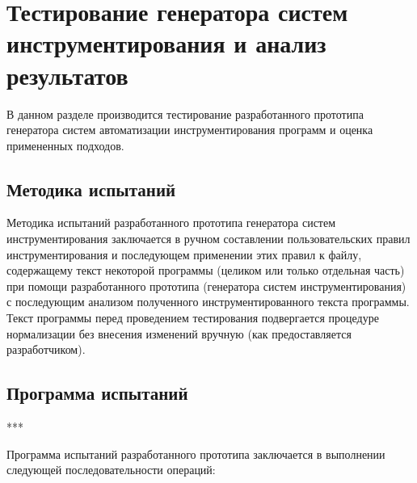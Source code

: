 \chapter{Тестирование генератора систем инструментирования и анализ результатов}

В данном разделе производится тестирование разработанного прототипа генератора систем автоматизации инструментирования программ и оценка примененных подходов.

\section{Методика испытаний}

Методика испытаний разработанного прототипа генератора систем инструментирования заключается в ручном составлении пользовательских правил инструментирования и последующем применении этих правил к файлу, содержащему текст некоторой программы (целиком или только отдельная часть) при помощи разработанного прототипа (генератора систем инструментирования) с последующим анализом полученного инструментированного текста программы.
Текст программы перед проведением тестирования подвергается процедуре нормализации без внесения изменений вручную (как предоставляется разработчиком).

\section{Программа испытаний}

***

Программа испытаний разработанного прототипа заключается в выполнении следующей последовательности операций:

